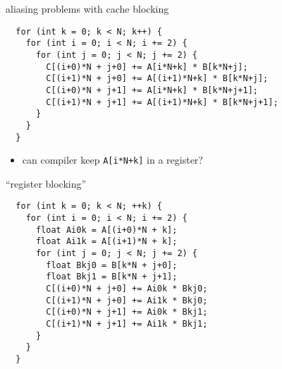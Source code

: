 
\begin{frame}[fragile,label=blockingAliasing]{aliasing problems with cache blocking}
\lstset{
    style=small,
    language=C
}
\begin{lstlisting}
  for (int k = 0; k < N; k++) {
    for (int i = 0; i < N; i += 2) {
      for (int j = 0; j < N; j += 2) {
        C[(i+0)*N + j+0] += A[i*N+k] * B[k*N+j];
        C[(i+1)*N + j+0] += A[(i+1)*N+k] * B[k*N+j];
        C[(i+0)*N + j+1] += A[i*N+k] * B[k*N+j+1];
        C[(i+1)*N + j+1] += A[(i+1)*N+k] * B[k*N+j+1];
      }
    }
  }
\end{lstlisting}
\begin{itemize}
    \item can compiler keep \lstinline|A[i*N+k]| in a register?
\end{itemize}
\end{frame}



\begin{frame}[fragile,label=registerBlocking]{``register blocking''}
\lstset{
    style=small,
    language=C
}
\begin{lstlisting}
  for (int k = 0; k < N; ++k) {
    for (int i = 0; i < N; i += 2) {
      float Ai0k = A[(i+0)*N + k];
      float Ai1k = A[(i+1)*N + k];
      for (int j = 0; j < N; j += 2) {
        float Bkj0 = B[k*N + j+0];
        float Bkj1 = B[k*N + j+1];
        C[(i+0)*N + j+0] += Ai0k * Bkj0;
        C[(i+1)*N + j+0] += Ai1k * Bkj0;
        C[(i+0)*N + j+1] += Ai0k * Bkj1;
        C[(i+1)*N + j+1] += Ai1k * Bkj1;
      }
    }
  }
\end{lstlisting}
\end{frame}

